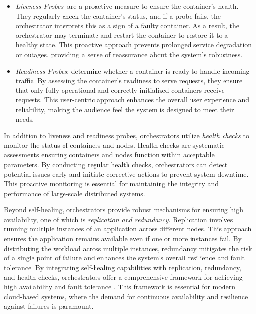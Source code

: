 \begin{itemize}
  \itemsep0em
   \item \textit{Liveness Probes}: are a proactive measure to ensure the
     container's health.
     They regularly check the container's status, and if a probe fails, the
     orchestrator interprets this as a sign of a faulty container.
     As a result, the orchestrator may terminate and restart the container to
     restore it to a healthy state. This proactive approach prevents prolonged
     service degradation or outages, providing a sense of reassurance about the
     system's robustness.
    \item \textit{Readiness Probes}: determine whether a container is ready to
      handle incoming traffic.
      By assessing the container's readiness to serve requests, they ensure that
      only fully operational and correctly initialized containers receive requests.
      This user-centric approach enhances the overall user experience and
      reliability, making the audience feel the system is designed to meet their
      needs.
\end{itemize}

In addition to liveness and readiness probes, orchestrators utilize
\textit{health checks} to monitor the status of containers and nodes.
Health checks are systematic assessments ensuring containers and nodes function
within acceptable parameters.
By conducting regular health checks, orchestrators can detect potential issues
early and initiate corrective actions to prevent system downtime. This proactive
monitoring is essential for maintaining the integrity and performance of
large-scale distributed systems.

Beyond self-healing, orchestrators provide robust mechanisms for ensuring high
availability, one of which is \textit{replication and redundancy}.
Replication involves running multiple instances of an application across
different nodes.
This approach ensures the application remains available even if one or more
instances fail.
By distributing the workload across multiple instances, redundancy mitigates the
risk of a single point of failure and enhances the system's overall resilience
and fault tolerance.
By integrating self-healing capabilities with replication, redundancy, and
health checks, orchestrators offer a comprehensive framework for achieving high
availability and fault tolerance \cite{Brendan2016}.
This framework is essential for modern cloud-based systems, where the demand for
continuous availability and resilience against failures is paramount.



